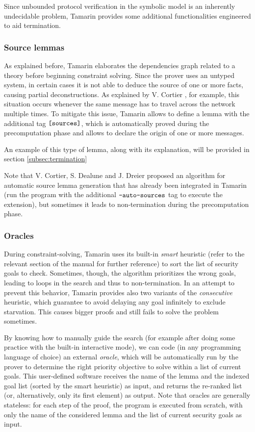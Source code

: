 \documentclass{article}
\newcommand{\mono}[1]{\textrm{\tt #1}}
\begin{document}
Since unbounded protocol verification in the symbolic model is an inherently undecidable problem, Tamarin provides some additional functionalities engineered to aid termination.

\subsubsection{Source lemmas}

As explained before, Tamarin elaborates the dependencies graph related to a theory before beginning constraint solving. Since the prover uses an untyped system, in certain cases it is not able to deduce the source of one or more facts, causing partial deconstructions. As explained by V. Cortier \cite{autosources}, for example, this situation occurs whenever the same message has to travel across the network multiple times. To mitigate this issue, Tamarin allows to define a lemma with the additional tag $\mono{[sources]}$, which is automatically proved during the precomputation phase and allows to declare the origin of one or more messages.

An example of this type of lemma, along with its explanation, will be provided in section \ref{subsec:termination}

Note that V. Cortier, S. Dealune and J. Dreier proposed an algorithm for automatic source lemma generation \cite{autosources} that has already been integrated in Tamarin (run the program with the additional $\mono{--auto-sources}$ tag to execute the extension), but sometimes it leads to non-termination during the precomputation phase.

\subsubsection{Oracles}

During constraint-solving, Tamarin uses its built-in \textit{smart} heuristic (refer to the relevant section of the manual \cite{tamarinManual} for further reference) to sort the list of security goals to check. Sometimes, though, the algorithm prioritizes the wrong goals, leading to loops in the search and thus to non-termination. In an attempt to prevent this behavior, Tamarin provides also two variants of the \textit{consecutive} heuristic, which guarantee to avoid delaying any goal infinitely to exclude starvation. This causes bigger proofs and still fails to solve the problem sometimes.

By knowing how to manually guide the search (for example after doing some practice with the built-in interactive mode), we can code (in any programming language of choice) an external \textit{oracle}, which will be automatically run by the prover to determine the right priority objective to solve within a list of current goals. This user-defined software receives the name of the lemma and the indexed goal list (sorted by the smart heuristic) as input, and returns the re-ranked list (or, alternatively, only its first element) as output. Note that oracles are generally stateless: for each step of the proof, the program is executed from scratch, with only the name of the considered lemma and the list of current security goals as input.
\end{document}
